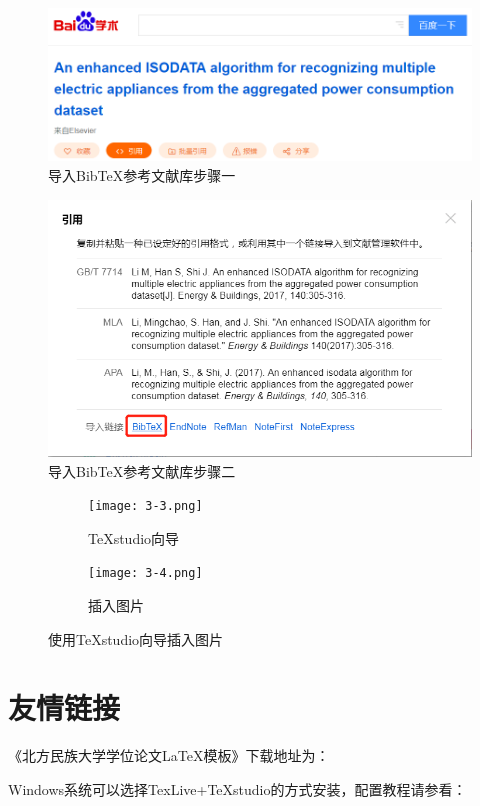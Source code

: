 \begin{figure}[tbh!]
	\centering
	\includegraphics[width=0.6\linewidth]{figures/sample/3-1}
	\caption{导入BibTeX参考文献库步骤一}
	\label{fig:3-1}
\end{figure}

\begin{figure}[tbh!]
	\centering
	\includegraphics[width=0.6\linewidth]{figures/sample/3-2}
	\caption{导入BibTeX参考文献库步骤二}
	\label{fig:3-2}
\end{figure}

\begin{figure}[htb!]
	\centering
	\begin{subfigure}[b]{.4\textwidth}
		\centering
		\texttt{[image: 3-3.png]}
		\caption{TeXstudio向导}\label{subfig:3a}
	\end{subfigure}
	\begin{subfigure}[b]{.4\textwidth}
		\centering
		\texttt{[image: 3-4.png]}
		\caption{插入图片}\label{subfig:3b}
	\end{subfigure}
	\caption{使用TeXstudio向导插入图片}\label{fig:3}
\end{figure}

\section{友情链接}
\label{friendly_link}
\noindent《北方民族大学学位论文\LaTeX{}模板》下载地址为：


\noindent Windows系统可以选择TexLive+TeXstudio的方式安装，配置教程请参看：


